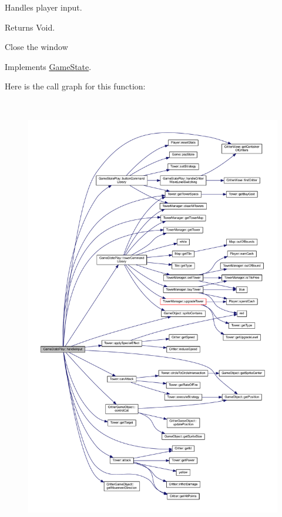Handles player input. 

\begin{DoxyReturn}{Returns}
Void. 
\end{DoxyReturn}
Close the window 

Implements \hyperlink{class_game_state_a970b55edd5a1da31ea0f7113e2c1f85a}{Game\+State}.



Here is the call graph for this function\+:
\nopagebreak
\begin{figure}[H]
\begin{center}
\leavevmode
\includegraphics[height=550pt]{class_game_state_play_ae9acc781e1fdbc931784ba3892c469ce_cgraph}
\end{center}
\end{figure}


